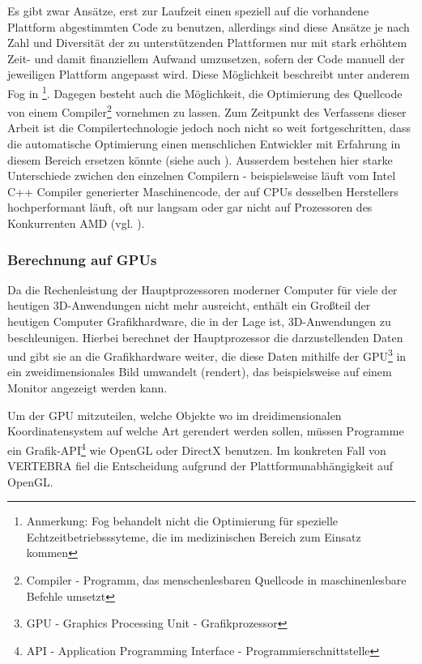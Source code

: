 \documentclass[a4paper,titlepage,12pt]{scrartcl}
\newtheorem[L]{boxedDefinition}{Definition}
\begin{document}
Es gibt zwar Ansätze, erst zur Laufzeit einen speziell auf die vorhandene Plattform abgestimmten Code zu benutzen, allerdings sind diese Ansätze je nach Zahl und Diversität der zu unterstützenden Plattformen nur mit stark erhöhtem Zeit- und damit finanziellem Aufwand umzusetzen, sofern der Code manuell der jeweiligen Plattform angepasst wird. Diese Möglichkeit beschreibt unter anderem Fog in \cite{Fog2010}\footnote{Anmerkung: Fog behandelt nicht die Optimierung für spezielle Echtzeitbetriebsssyteme, die im medizinischen Bereich zum Einsatz kommen}. Dagegen besteht auch die Möglichkeit, die Optimierung des Quellcode von einem Compiler\footnote{Compiler - Programm, das menschenlesbaren Quellcode in maschinenlesbare Befehle umsetzt} vornehmen zu lassen. Zum Zeitpunkt des Verfassens dieser Arbeit ist die Compilertechnologie jedoch noch nicht so weit fortgeschritten, dass die automatische Optimierung einen menschlichen Entwickler mit Erfahrung in diesem Bereich ersetzen könnte (siehe auch \cite{Fog2010}). Ausserdem bestehen hier starke Unterschiede zwichen den einzelnen Compilern - beispielsweise läuft vom Intel C++ Compiler generierter Maschinencode, der auf CPUs desselben Herstellers hochperformant läuft, oft nur langsam oder gar nicht auf Prozessoren des Konkurrenten AMD (vgl. \cite[Kapitel 2.5, Seite 10]{Fog2010}).
\subsubsection{Berechnung auf GPUs}\label{sssec:gpucalculation}
Da die Rechenleistung der Hauptprozessoren moderner Computer für viele der heutigen 3D-Anwendungen nicht mehr ausreicht, enthält ein Großteil der heutigen Computer Grafikhardware, die in der Lage ist, 3D-Anwendungen zu beschleunigen. Hierbei berechnet der Hauptprozessor die darzustellenden Daten und gibt sie an die Grafikhardware weiter, die diese Daten mithilfe der GPU\footnote{GPU - Graphics Processing Unit - Grafikprozessor} in ein zweidimensionales Bild umwandelt (rendert), das beispielsweise auf einem Monitor angezeigt werden kann.

Um der GPU mitzuteilen, welche Objekte wo im dreidimensionalen Koordinatensystem auf welche Art gerendert werden sollen, müssen Programme ein Grafik-API\footnote{API - Application Programming Interface - Programmierschnittstelle} wie OpenGL oder DirectX benutzen. Im konkreten Fall von VERTEBRA fiel die Entscheidung aufgrund der Plattformunabhängigkeit auf OpenGL.
\end{document}
